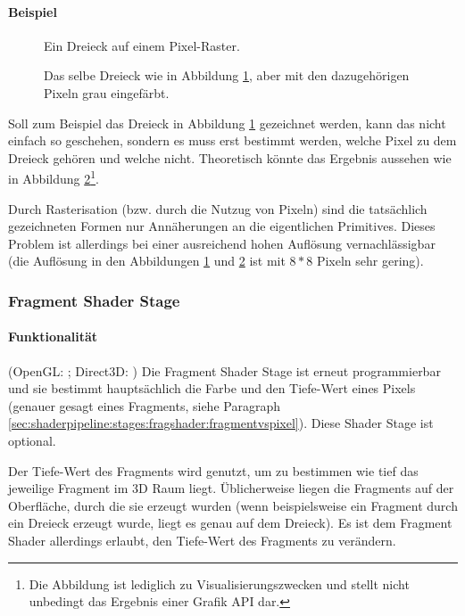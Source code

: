\paragraph{Beispiel}

\begin{figure}
    \caption{Ein Dreieck auf einem Pixel-Raster.}
    \label{fig:rasterizergfxnotfilled}
    \drawrasterizergfxnotfilled
\end{figure}

\begin{figure}
    \caption{Das selbe Dreieck wie in Abbildung \ref{fig:rasterizergfxnotfilled}, aber mit den dazugehörigen Pixeln grau eingefärbt.}
    \label{fig:rasterizergfxfilled}
    \drawrasterizergfxfilled
\end{figure}

Soll zum Beispiel das Dreieck in Abbildung \ref{fig:rasterizergfxnotfilled} gezeichnet werden, kann das nicht einfach so geschehen, sondern es muss erst bestimmt werden, welche Pixel zu dem Dreieck gehören und welche nicht. Theoretisch könnte das Ergebnis aussehen wie in Abbildung \ref{fig:rasterizergfxfilled}\footnote{Die Abbildung ist lediglich zu Visualisierungszwecken und stellt nicht unbedingt das Ergebnis einer Grafik API dar.}.

Durch Rasterisation (bzw. durch die Nutzug von Pixeln) sind die tatsächlich gezeichneten Formen nur Annäherungen an die eigentlichen Primitives. Dieses Problem ist allerdings bei einer ausreichend hohen Auflösung vernachlässigbar (die Auflösung in den Abbildungen \ref{fig:rasterizergfxnotfilled} und \ref{fig:rasterizergfxfilled} ist mit $8*8$ Pixeln sehr gering).

\subsubsection{Fragment Shader Stage}
\paragraph{Funktionalität}
(OpenGL: \cite{stage_gl_fragment_shader}; Direct3D: \cite{stage_d3d_fragment_shader})
Die Fragment Shader Stage ist erneut programmierbar und sie bestimmt hauptsächlich die Farbe und den Tiefe-Wert eines Pixels (genauer gesagt eines Fragments, siehe Paragraph \ref{sec:shaderpipeline:stages:fragshader:fragmentvspixel}). Diese Shader Stage ist optional.

Der Tiefe-Wert des Fragments wird genutzt, um zu bestimmen wie tief das jeweilige Fragment im 3D Raum liegt. Üblicherweise liegen die Fragments auf der Oberfläche, durch die sie erzeugt wurden (wenn beispielsweise ein Fragment durch ein Dreieck erzeugt wurde, liegt es genau auf dem Dreieck). Es ist dem Fragment Shader allerdings erlaubt, den Tiefe-Wert des Fragments zu verändern.

